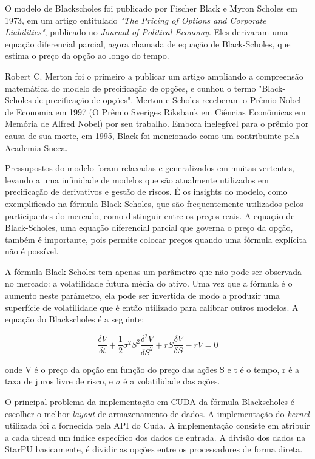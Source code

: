 O modelo de Blackscholes foi publicado por Fischer Black e Myron Scholes em 1973, em um artigo entitulado \emph{"The Pricing of Options and Corporate Liabilities"}, publicado no \emph{Journal of Political Economy}. Eles derivaram uma equação diferencial parcial, agora chamada de equação de Black-Scholes, que estima o preço da opção ao longo do tempo. 

Robert C. Merton foi o primeiro a publicar um artigo ampliando a compreensão matemática do modelo de precificação de opções, e cunhou o termo "Black-Scholes de precificação de opções". Merton e Scholes receberam o Prêmio Nobel de Economia em 1997 (O Prêmio Sveriges Riksbank em Ciências Econômicas em Memória de Alfred Nobel) por seu trabalho. Embora inelegível para o prêmio por causa de sua morte, em 1995, Black foi mencionado como um contribuinte pela Academia Sueca. 

Pressupostos do modelo foram relaxadas e generalizados em muitas vertentes, levando a uma infinidade de modelos que são atualmente utilizados em precificação de derivativos e gestão de riscos. É os insights do modelo, como exemplificado na fórmula Black-Scholes, que são frequentemente utilizados pelos participantes do mercado, como distinguir entre os preços reais. A equação de Black-Scholes, uma equação diferencial parcial que governa o preço da opção, também é importante, pois permite colocar preços quando uma fórmula explícita não é possível. 

A fórmula Black-Scholes tem apenas um parâmetro que não pode ser observada no mercado: a volatilidade futura média do ativo. Uma vez que a fórmula é o aumento neste parâmetro, ela pode ser invertida de modo a produzir uma superfície de volatilidade que é então utilizado para calibrar outros modelos. A equação do Blackscholes é a seguinte:

\begin{equation} \frac {\delta V}{\delta t} + \frac{1}{2} \sigma^2 S^2 \frac{\delta^2 V}{\delta S^2} + rS \frac{\delta V}{\delta S} - rV = 0
 \label{eq:black}
\end{equation}

onde V é o preço da opção em função do preço das ações S e t é o tempo, r é a taxa de juros livre de risco, e $\sigma$ é a volatilidade das ações.

O principal problema da implementação em CUDA da fórmula Blackscholes é escolher o melhor \emph{layout} de armazenamento de dados. A implementação do \emph{kernel} utilizada foi a fornecida pela API do Cuda. A implementação consiste em atribuir a cada thread um 
índice específico dos dados de entrada. A divisão dos dados na StarPU basicamente, é dividir as opções entre os processadores de forma direta. 


